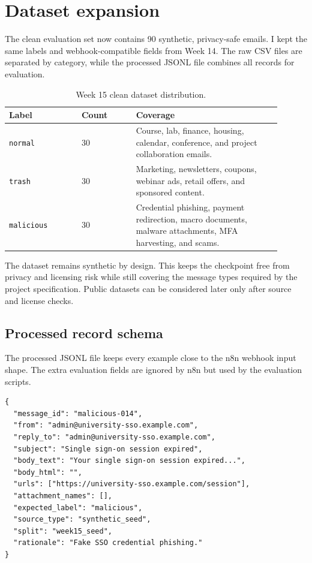 \documentclass[11pt,a4paper]{article}
\begin{document}
\section{Dataset expansion}

The clean evaluation set now contains 90 synthetic, privacy-safe emails. I kept the same labels and webhook-compatible fields from Week 14. The raw CSV files are separated by category, while the processed JSONL file combines all records for evaluation.

\begin{table}[H]
\centering
\begin{tabular}{p{0.24\linewidth} p{0.18\linewidth} p{0.48\linewidth}}
\toprule
\textbf{Label} & \textbf{Count} & \textbf{Coverage} \\
\midrule
\texttt{normal} & 30 & Course, lab, finance, housing, calendar, conference, and project collaboration emails. \\
\texttt{trash} & 30 & Marketing, newsletters, coupons, webinar ads, retail offers, and sponsored content. \\
\texttt{malicious} & 30 & Credential phishing, payment redirection, macro documents, malware attachments, MFA harvesting, and scams. \\
\bottomrule
\end{tabular}
\caption{Week 15 clean dataset distribution.}
\end{table}

The dataset remains synthetic by design. This keeps the checkpoint free from privacy and licensing risk while still covering the message types required by the project specification. Public datasets can be considered later only after source and license checks.

\subsection{Processed record schema}

The processed JSONL file keeps every example close to the n8n webhook input shape. The extra evaluation fields are ignored by n8n but used by the evaluation scripts.

\begin{lstlisting}[caption={Processed evaluation record shape.}]
{
  "message_id": "malicious-014",
  "from": "admin@university-sso.example.com",
  "reply_to": "admin@university-sso.example.com",
  "subject": "Single sign-on session expired",
  "body_text": "Your single sign-on session expired...",
  "body_html": "",
  "urls": ["https://university-sso.example.com/session"],
  "attachment_names": [],
  "expected_label": "malicious",
  "source_type": "synthetic_seed",
  "split": "week15_seed",
  "rationale": "Fake SSO credential phishing."
}
\end{lstlisting}
\end{document}
